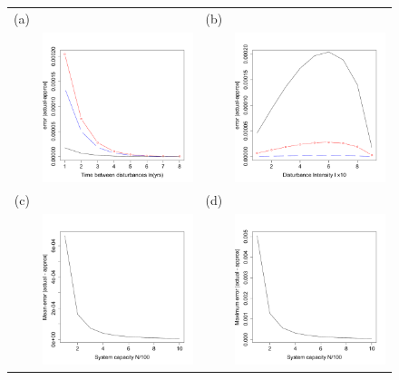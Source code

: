  \begin{figure}[th]
\centering
   \begin{tabular}{rrrr}
   (a)&&(b)&\\
  &\includegraphics[width=2.5in]{errwithTub.pdf} && \includegraphics[width=2.5in]{errwithIub.pdf} \\
  (c)&&(d)&\\
  &\includegraphics[width=2.5in]{meanerrortotovermatrix.pdf} && \includegraphics[width=2.5in]{maxerrortotovermatrix.pdf} \end{tabular}

\end{figure}
